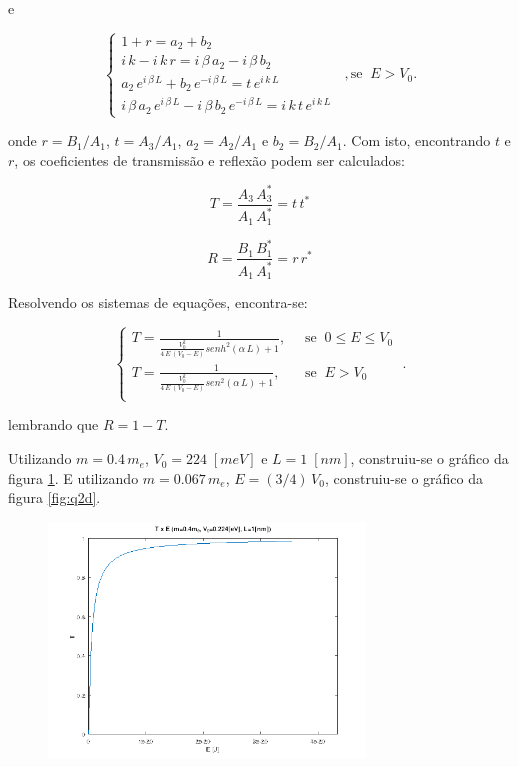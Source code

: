 \noindent e

\begin{equation}
	\begin{cases}
		1 + r = a_2 + b_2                                             \\
		i\,k - i\,k\,r = i\,\beta\,a_2 - i\,\beta\,b_2                \\
		a_2\,e^{i\,\beta\,L} + b_2\,e^{-i\,\beta\,L} = t\,e^{i\,k\,L} \\
		i\,\beta\,a_2\,e^{i\,\beta\,L} - i\,\beta\,b_2\,e^{-i\,\beta\,L} =
		i\,k\,t\,e^{i\,k\,L}
	\end{cases}\;\;, \mbox{se}\;\;E > V_0.
\end{equation}

\noindent onde $r=B_1/A_1$, $t=A_3/A_1$, $a_2=A_2/A_1$ e $b_2=B_2/A_1$. Com
isto, encontrando $t$ e $r$, os coeficientes de transmissão e reflexão podem
ser calculados:

\begin{equation}
	T=\frac{A_3\,A_3^*}{A_1\,A_1^*} = t\,t^*
\end{equation}

\begin{equation}
	R=\frac{B_1\,B_1^*}{A_1\,A_1^*} = r\,r^*
\end{equation}

Resolvendo os sistemas de equações, encontra-se:

\begin{equation}
	\begin{cases}
		T=\frac{1}{\frac{V_0^2}{4\,E\,(V_0-E)}senh^2(\alpha\,L)+1},
		 & \;\;\mbox{se}\;\;0 \le E \le V_0 \\
		T=\frac{1}{\frac{V_0^2}{4\,E\,(V_0-E)}sen^2(\alpha\,L)+1},
		 & \;\;\mbox{se}\;\;E > V_0         \\
	\end{cases}\;.
\end{equation}

\noindent lembrando que $R=1-T$.

Utilizando $m=0.4\,m_e$, $V_0=224\;[meV]$ e $L=1\;[nm]$, construiu-se o gráfico
da figura \ref{fig:q2c}. E utilizando $m=0.067\,m_e$, $E=(3/4)\,V_0$,
construiu-se o gráfico da figura \ref{fig:q2d}.

\begin{figure}[H] \centering
	\includegraphics[width=0.75\textwidth]{../images/q2c.png}
	\label{fig:q2c}
\end{figure}

